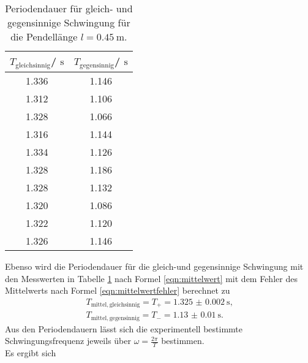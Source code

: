 \begin{table}
	\centering
	\caption{Periodendauer für gleich- und gegensinnige Schwingung für die Pendellänge $l=\SI{0.45}{\meter}$.}
	\label{tab:gleichgegen}
	\begin{tabular}{cc}
		\toprule
		$T_{\mathrm{gleichsinnig}}$/ $\si{\second}$ & $T_{\mathrm{gegensinnig}}$/ $\si{\second}$ \\
		\midrule
		1.336                                       & 1.146                                      \\
		1.312                                       & 1.106                                      \\
		1.328                                       & 1.066                                      \\
		1.316                                       & 1.144                                      \\
		1.334                                       & 1.126                                      \\
		1.328                                       & 1.186                                      \\
		1.328                                       & 1.132                                      \\
		1.320                                       & 1.086                                      \\
		1.322                                       & 1.120                                      \\
		1.326                                       & 1.146                                      \\
		\bottomrule
	\end{tabular}
\end{table}
Ebenso wird die Periodendauer für die gleich-und gegensinnige Schwingung mit den Messwerten in Tabelle \ref{tab:gleichgegen} nach Formel \eqref{eqn:mittelwert} mit dem Fehler des Mittelwerts nach Formel \eqref{eqn:mittelwertfehler} berechnet zu
\begin{gather*}
	T_{\mathrm{mittel, gleichsinnig}}=T_{\mathrm{+}}=\SI{1.325(2)}{\second} \text{,}\\
	T_{\mathrm{mittel, gegensinnig}}=T_{\mathrm{-}} =\SI{1.13(1)}{\second} \text{.}
\end{gather*}
Aus den Periodendauern lässt sich die experimentell bestimmte Schwingungsfrequenz jeweils über $\omega=\frac{2\pi}{T}$ bestimmen.
\\Es ergibt sich
